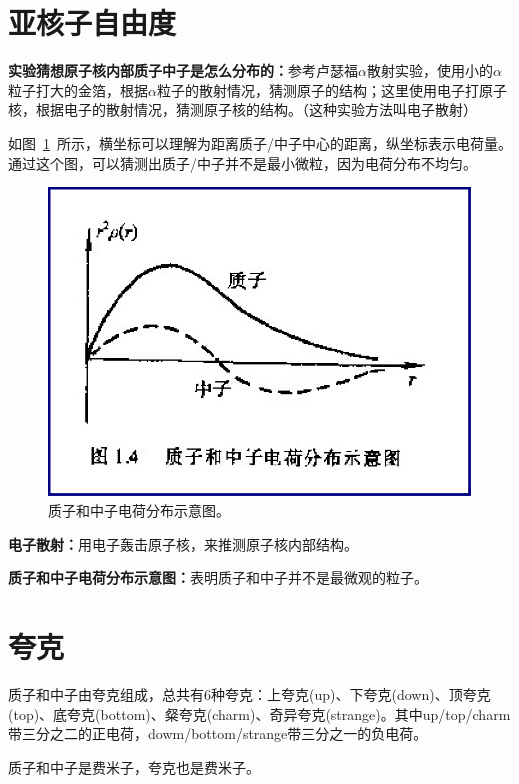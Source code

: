\section{亚核子自由度}

\textbf{实验猜想原子核内部质子中子是怎么分布的：}参考卢瑟福$\alpha$散射实验，使用小的$\alpha$粒子打大的金箔，根据$\alpha$粒子的散射情况，猜测原子的结构；这里使用电子打原子核，根据电子的散射情况，猜测原子核的结构。（这种实验方法叫电子散射）

如图~\ref{fig002}~所示，横坐标可以理解为距离质子/中子中心的距离，纵坐标表示电荷量。通过这个图，可以猜测出质子/中子并不是最小微粒，因为电荷分布不均匀。

\begin{figure}[htbp]
    \centering
    \includegraphics[width=14cm]{figure//fig002.png}
    \caption{\label{fig002}质子和中子电荷分布示意图。}
\end{figure}

\textbf{电子散射：}用电子轰击原子核，来推测原子核内部结构。

\textbf{质子和中子电荷分布示意图：}表明质子和中子并不是最微观的粒子。

\section{夸克}

质子和中子由夸克组成，总共有6种夸克：上夸克(up)、下夸克(down)、顶夸克(top)、底夸克(bottom)、粲夸克(charm)、奇异夸克(strange)。其中up/top/charm带三分之二的正电荷，dowm/bottom/strange带三分之一的负电荷。

质子和中子是费米子，夸克也是费米子。

